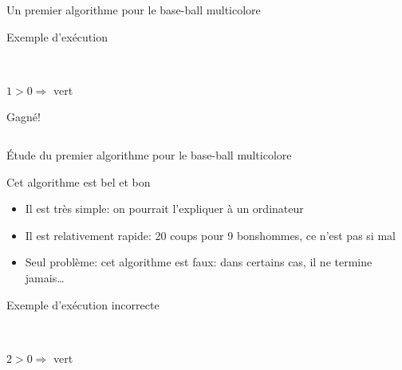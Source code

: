 \documentclass[final,hyperref={pdfpagelabels=false}]{beamer}
\renewcommand*{\small}{\fontsize{\resultsmallX}{\resultsmallY}\selectfont}
\begin{document}
\begin{frame}{Un premier algorithme pour le base-ball multicolore}
\begin{block}{Exemple d'exécution}
\begin{columns}[t]
      \begin{column}{.15\linewidth}\center
        \\
         {\small $1>0\Rightarrow$ vert}

         \alert{Gagné!}
      \end{column}
    \end{columns}
  \end{block}
\end{frame}
\begin{frame}{Étude du premier algorithme pour le base-ball multicolore}
  \begin{block}{Cet algorithme est bel et bon}
    \begin{itemize}
    \item Il est très simple: on pourrait l'expliquer à un ordinateur
    \item Il est relativement rapide: 20 coups pour 9 bonshommes, ce n'est pas
      si mal
    \item Seul problème: cet algorithme est faux: dans certains cas, il ne
      termine jamais\ldots
    \end{itemize}
  \end{block}

  \begin{block}{Exemple d'exécution incorrecte}
    \begin{columns}[t]
      \begin{column}{.15\linewidth}\center
        \\
         {\small $2>0\Rightarrow$ vert}
      \end{column}
    \end{columns}
  \end{block}
\end{frame}
\end{document}
